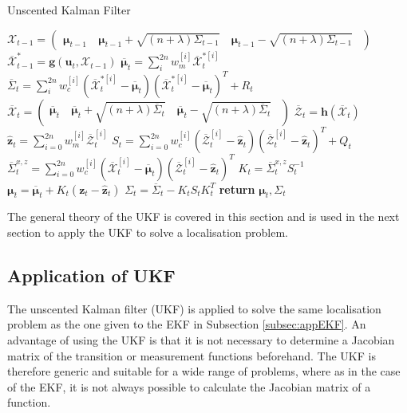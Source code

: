 \documentclass[12pt,oneside,openany,a4paper, %
afrikaans,english,
]{memoir}
\numberwithin{equation}{chapter}
\begin{document}
{\begin{algorithm}[H]
\caption{Unscented Kalman Filter}\label{alg:UKF}
\begin{algorithmic}[1]
\State $\mathcal{X}_{t-1} = 
\begin{pmatrix}
\bm{\mu}_{t-1}  & \ \bm{\mu}_{t-1}+\sqrt{(n + \lambda)\Sigma_{t-1}} & \ \bm{\mu}_{t-1} - \sqrt{(n + \lambda)\Sigma_{t-1}}\ \ 
\end{pmatrix}
$ 
\State $\overline{\mathcal{X}}^*_{t-1} = \bm{g}(\bm{u}_t, \mathcal{X}_{t-1})$
\State $\bm{\overline{\mu}}_t = \sum_i^{2n} w_m^{[i]} \overline{\mathcal{X}}^{*[i]}_{t}$
\State $\overline{\Sigma}_t = \sum_i^{2n}w_c^{[i]}\left(\mathcal{\overline{X}}_t^{*[i]} - \overline{\bm{\mu}}_t\right)\left(\mathcal{\overline{X}}_t^{*[i]} - \overline{\bm{\mu}}_t\right)^T +R_t$
\State $\mathcal{\overline{X}}_t = 
\begin{pmatrix}
\bm{\overline{\mu}}_{t}  & \ \bm{\overline{\mu}}_{t}+\sqrt{(n + \lambda)\overline{\Sigma}_{t}} & \ \bm{\overline{\mu}}_{t} -  \sqrt{(n + \lambda)\overline{\Sigma}_{t}}\ \ 
\end{pmatrix}$
\State $\overline{\mathcal{Z}}_t = \bm{h}\left(\mathcal{\overline{X}}_t\right)$
\State $\hat{\bm{z}}_t = \sum_{i=0}^{2n}w_m^{[i]} \overline{\mathcal{Z}}_t^{[i]}$ 
\State $S_t = \sum_{i=0}^{2n} w_c^{[i]}\left( \overline{\mathcal{Z}}_t^{[i]} - \hat{\bm{z}}_t  \right)\left( \overline{\mathcal{Z}}_t^{[i]} - \hat{\bm{z}}_t  \right)^T + Q_t$
\State $\overline{\Sigma}_t^{x,z} = \sum_{i=0}^{2n}  w_c^{[i]}\left( \overline{\mathcal{X}}_t^{[i]} - \overline{\bm{\mu}}_t  \right)\left( \overline{\mathcal{Z}}_t^{[i]} - \hat{\bm{z}}_t  \right)^T $
\State $K_t = \overline{\Sigma}_t^{x,z}S_t^{-1}$
\State $\bm{\mu}_t = \overline{\bm{\mu}}_t + K_t(\bm{z}_t - \hat{\bm{z}}_t)$
\State $\Sigma_t = \overline{\Sigma}_t - K_tS_tK_t^T$
\State \textbf{return} $\bm{\mu}_t, \Sigma_t$
\EndProcedure
\end{algorithmic}
\end{algorithm}
The general theory of the UKF is covered in this section and is used in the next section to apply the UKF to solve a localisation problem.
\subsection{Application of UKF}
The unscented Kalman filter (UKF) is applied to solve the same localisation problem as the one given to the EKF in Subsection \ref{subsec:appEKF}. An advantage of using the UKF is that it is not necessary to determine a Jacobian matrix of the transition or measurement functions beforehand. The UKF is therefore generic and suitable for a wide range of problems, where as in the case of the EKF, it is not always possible to calculate the Jacobian matrix of a function.

}
\end{document}
